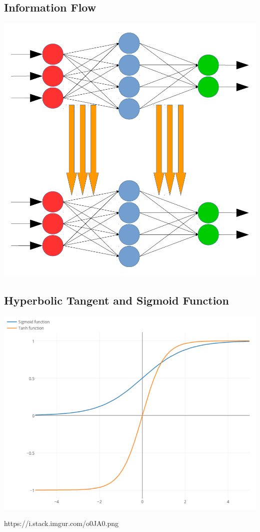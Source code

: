 \documentclass[a0,portrait,25pt]{sciposter}
\begin{document}
\begin{multicols}{3}
\begin{mdframed}[backgroundcolor=white,roundcorner=4pt,shadow=true,linewidth=1pt]
\section*{Information Flow}
\begin{minipage}[c]{1\linewidth}
\includegraphics[width=0.9\linewidth]{fig05}
\end{minipage}
\end{mdframed}

\begin{mdframed}[backgroundcolor=white,roundcorner=4pt,shadow=true,linewidth=1pt]
\color{Black}
\section*{Hyperbolic Tangent and Sigmoid Function}
\begin{minipage}[c]{1\linewidth}
\includegraphics[width=0.9\linewidth]{fig02}
\end{minipage}
https://i.stack.imgur.com/o0JA0.png
\end{mdframed}


\end{multicols}
\end{document}
